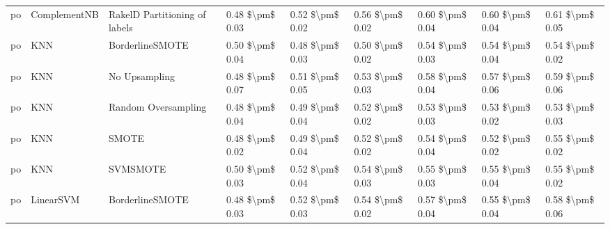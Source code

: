 \begin{tabular}{lllllllll}
      po &                    ComplementNB & RakelD Partitioning of labels & 0.48 \$\textbackslash pm\$ 0.03 &           0.52 \$\textbackslash pm\$ 0.02 &       0.56 \$\textbackslash pm\$ 0.02 &        0.60 \$\textbackslash pm\$ 0.04 &                         0.60 \$\textbackslash pm\$ 0.04 &     0.61 \$\textbackslash pm\$ 0.05 \\
      po &                             KNN &               BorderlineSMOTE & 0.50 \$\textbackslash pm\$ 0.04 &           0.48 \$\textbackslash pm\$ 0.03 &       0.50 \$\textbackslash pm\$ 0.02 &        0.54 \$\textbackslash pm\$ 0.03 &                         0.54 \$\textbackslash pm\$ 0.04 &     0.54 \$\textbackslash pm\$ 0.02 \\
      po &                             KNN &                 No Upsampling & 0.48 \$\textbackslash pm\$ 0.07 &           0.51 \$\textbackslash pm\$ 0.05 &       0.53 \$\textbackslash pm\$ 0.03 &        0.58 \$\textbackslash pm\$ 0.04 &                         0.57 \$\textbackslash pm\$ 0.06 &     0.59 \$\textbackslash pm\$ 0.06 \\
      po &                             KNN &           Random Oversampling & 0.48 \$\textbackslash pm\$ 0.04 &           0.49 \$\textbackslash pm\$ 0.04 &       0.52 \$\textbackslash pm\$ 0.02 &        0.53 \$\textbackslash pm\$ 0.03 &                         0.53 \$\textbackslash pm\$ 0.02 &     0.53 \$\textbackslash pm\$ 0.03 \\
      po &                             KNN &                         SMOTE & 0.48 \$\textbackslash pm\$ 0.02 &           0.49 \$\textbackslash pm\$ 0.04 &       0.52 \$\textbackslash pm\$ 0.02 &        0.54 \$\textbackslash pm\$ 0.04 &                         0.52 \$\textbackslash pm\$ 0.02 &     0.55 \$\textbackslash pm\$ 0.02 \\
      po &                             KNN &                      SVMSMOTE & 0.50 \$\textbackslash pm\$ 0.03 &           0.52 \$\textbackslash pm\$ 0.04 &       0.54 \$\textbackslash pm\$ 0.03 &        0.55 \$\textbackslash pm\$ 0.03 &                         0.55 \$\textbackslash pm\$ 0.04 &     0.55 \$\textbackslash pm\$ 0.02 \\
      po &                       LinearSVM &               BorderlineSMOTE & 0.48 \$\textbackslash pm\$ 0.03 &           0.52 \$\textbackslash pm\$ 0.03 &       0.54 \$\textbackslash pm\$ 0.02 &        0.57 \$\textbackslash pm\$ 0.04 &                         0.55 \$\textbackslash pm\$ 0.04 &     0.58 \$\textbackslash pm\$ 0.06 \\

\end{tabular}
